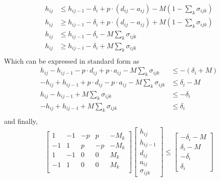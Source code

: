 \begin{equation} \begin{aligned}
	h_{ij} & \le h_{ij-1} - \delta_i + p\cdot(d_{ij} - a_{ij}) - M(1 - \sum_k\sigma_{ijk})\\
	h_{ij} & \ge h_{ij-1} - \delta_i + p\cdot(d_{ij} - a_{ij}) + M(1 - \sum_k\sigma_{ijk})\\
	h_{ij} & \le h_{ij-1} - \delta_i - M\sum_k\sigma_{ijk}\\
	h_{ij} & \ge h_{ij-1} - \delta_i + M\sum_k\sigma_{ijk}\\
\end{aligned} \end{equation}
Which can be expressed in standard form as
\begin{equation} \begin{aligned}
	h_{ij} - h_{ij-1} - p\cdot d_{ij} + p\cdot a_{ij} - M\sum_k\sigma_{ijk} &\le -\left(\delta_i + M\right) \\
	-h_{ij} + h_{ij-1} + p\cdot d_{ij} - p\cdot a_{ij} - M\sum_k\sigma_{ijk} &\le \delta_i - M \\
	h_{ij} - h_{ij-1} + M\sum_k\sigma_{ijk} &\le -\delta_i \\
	-h_{ij} + h_{ij-1} + M\sum_k\sigma_{ijk} & \le \delta_i \\
\end{aligned} \end{equation}
and finally,
\begin{equation} \begin{aligned}
	\begin{bmatrix}1  & -1 & -p & p   & -M_k \\
		       -1 & 1  & p  & -p  & -M_k \\
		       1  & -1 & 0             & 0              & M_k  \\
		       -1 & 1  & 0             & 0              & M_k  \\
	\end{bmatrix}
	\begin{bmatrix}h_{ij} \\ h_{ij-1} \\ d_{ij} \\ a_{ij} \\ \sigma_{ijk} \end{bmatrix} \le 
		\begin{bmatrix}-\delta_i - M \\ \delta_i - M \\ -\delta_i \\ \delta_i \end{bmatrix}
\end{aligned} \end{equation}
